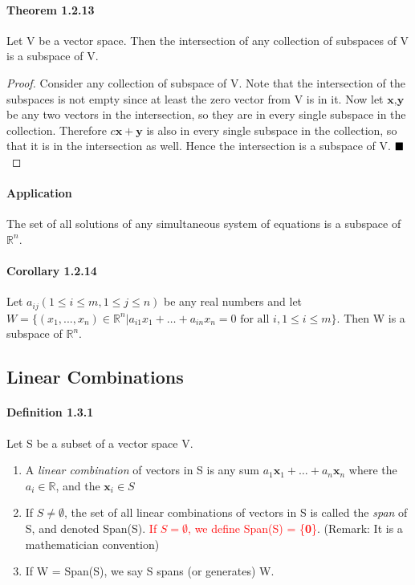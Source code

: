 \documentclass[11pt]{article}
\newcommand{\ti}[1]{\textit{#1}}
\newcommand{\tb}[1]{\textbf{#1}}
\newcommand{\qed}[0]{$\hfill\blacksquare$}
\newcommand{\real}[0]{\mathbb{R}}
\newcommand{\vx}[0]{\tb{x}}
\newcommand{\vy}[0]{\tb{y}}
\newcommand{\vo}[0]{\tb{0}}
\begin{document}
	\paragraph{Theorem 1.2.13} Let V be a vector space. Then the intersection of any collection of subspaces of V is a subspace of V. \newline
	\begin{proof}
		Consider any collection of subspace of V. Note that the intersection of the subspaces is not empty since at least the zero vector from V is in it. Now let $\vx, \vy$ be any two vectors in the intersection, so they are in every single subspace in the collection. Therefore $c\vx + \vy$ is also in every single subspace in the collection, so that it is in the intersection as well. Hence the intersection is a subspace of V. \qed
	\end{proof}
	\paragraph{Application} The set of all solutions of any simultaneous system of equations is a subspace of $\real^n$.
	\paragraph{Corollary 1.2.14} Let $a_{ij} (1 \leq i \leq m, 1\leq j \leq n)$ be any real numbers and let $W = \{(x_1,...,x_n) \in \real^n | a_{i1}x_1 + \hdots +a_{in}x_n = 0 \mbox{ for all } i, 1 \leq i \leq m\}$. Then W is a subspace of $\real^n$.
	
	
	\subsection{Linear Combinations}
	\paragraph{Definition 1.3.1} Let S be a subset of a vector space V.
	\begin{enumerate}
		\item A \ti{linear combination} of vectors in S is any sum $a_1\vx_1 + \hdots +  a_n \vx_n$ where the $a_i \in \real$, and the $\vx_i \in S$
		\item If $S \neq \emptyset$, the set of all linear combinations of vectors in S is called the \ti{span} of S, and denoted Span(S). \textcolor{red}{If $S = \emptyset$, we define Span(S) = \{\vo\}}. (Remark: It is a mathematician convention)
		\item If W = Span(S), we say S spans (or generates) W.
	\end{enumerate}
\end{document}
